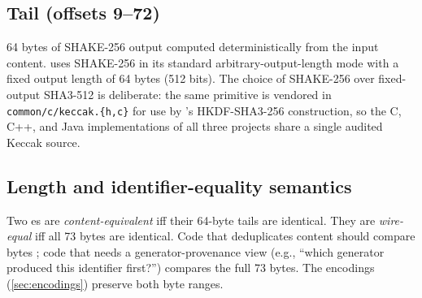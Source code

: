 \subsection{Tail (offsets 9--72)}

64 bytes of SHAKE-256 \citep{fips202} output computed deterministically from the input content. \pqhash{} uses SHAKE-256 in its standard arbitrary-output-length mode with a fixed output length of 64 bytes (512 bits). The choice of SHAKE-256 over fixed-output SHA3-512 is deliberate: the same primitive is vendored in \texttt{common/c/keccak.\{h,c\}} for use by \pqcrypt{}'s HKDF-SHA3-256 construction, so the C, C++, and Java implementations of all three projects share a single audited Keccak source.

\subsection{Length and identifier-equality semantics}

Two \pqhash{}es are \emph{content-equivalent} iff their 64-byte tails are identical. They are \emph{wire-equal} iff all 73 bytes are identical. Code that deduplicates content should compare bytes ; code that needs a generator-provenance view (e.g., ``which generator produced this identifier first?'') compares the full 73 bytes. The encodings (\cref{sec:encodings}) preserve both byte ranges.
